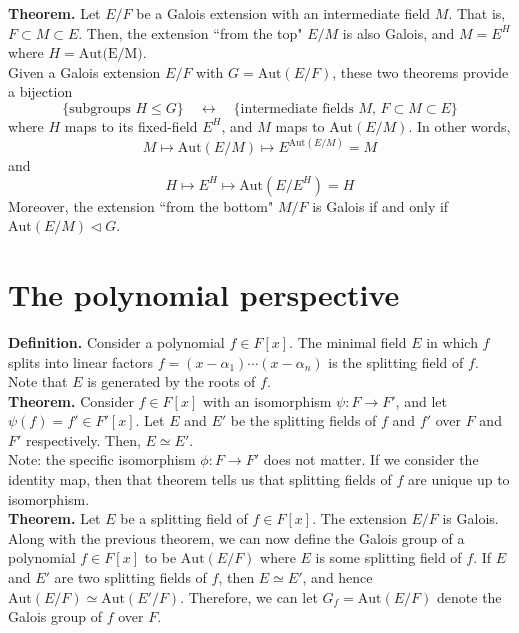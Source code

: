 \documentclass[10pt]{article}
\theoremstyle{definition}
\theoremstyle{remark}
\theoremstyle{definition}
\begin{document}
\noindent\textbf{Theorem.} Let $E/F$ be a Galois extension with an intermediate field $M$. That is, $F\subset M\subset E$. Then, the extension ``from the top" $E/M$ is also Galois, and $M = E^H$ where $H = \mbox{Aut(E/M)}$.\\

Given a Galois extension $E/F$ with $G = \mbox{Aut}(E/F)$, these two theorems provide a bijection$$\{\mbox{subgroups }H\leq G\}\quad \longleftrightarrow\quad \{\mbox{intermediate fields }M,\,F\subset M\subset E\}$$where $H$ maps to its fixed-field $E^H$, and $M$ maps to $\mbox{Aut}(E/M)$. In other words,$$M\mapsto \mbox{Aut}(E/M)\mapsto E^{\mbox{Aut}(E/M)} = M$$and$$H\mapsto E^H\mapsto\mbox{Aut}(E/E^H) = H$$Moreover, the extension ``from the bottom" $M/F$ is Galois if and only if $\mbox{Aut}(E/M) \triangleleft G$.

\section{The polynomial perspective}
\textbf{Definition.} Consider a polynomial $f \in F[x]$. The minimal field $E$ in which $f$ splits into linear factors $f = (x-\alpha_1)\cdots(x-\alpha_n)$ is the splitting field of $f$. Note that $E$ is generated by the roots of $f$.\\

\noindent\textbf{Theorem.} Consider $f\in F[x]$ with an isomorphism $\psi:F\to F'$, and let $\psi(f) = f' \in F'[x]$. Let $E$ and $E'$ be the splitting fields of $f$ and $f'$ over $F$ and $F'$ respectively. Then, $E \simeq E'$.\\

Note: the specific isomorphism $\phi:F\to F'$ does not matter. If we consider the identity map, then that theorem tells us that splitting fields of $f$ are unique up to isomorphism.\\

\noindent\textbf{Theorem.} Let $E$ be a splitting field of $f \in F[x]$. The extension $E/F$ is Galois.\\

Along with the previous theorem, we can now define the Galois group of a polynomial $f\in F[x]$ to be $\mbox{Aut}(E/F)$ where $E$ is some splitting field of $f$. If $E$ and $E'$ are two splitting fields of $f$, then $E \simeq E'$, and hence $\mbox{Aut}(E/F) \simeq \mbox{Aut}(E'/F)$. Therefore, we can let $G_f = \mbox{Aut}(E/F)$ denote the Galois group of $f$ over $F$.
\end{document}
